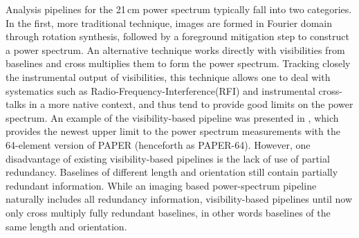 \documentclass[twocolumn,apj,numberedappendix]{emulateapj}
\renewcommand\[{\begin{equation}}
\renewcommand\]{\end{equation}}
\begin{document}
Analysis pipelines for the 21\,cm power spectrum typically fall into two categories. In the first, more traditional technique, images are formed in Fourier domain through rotation synthesis, followed by a foreground mitigation step to construct a power spectrum. An alternative technique works directly with visibilities from baselines and cross multiplies them to form the power spectrum. Tracking closely the instrumental output of visibilities, this technique allows one to deal with systematics such as Radio-Frequency-Interference(RFI) and instrumental cross-talks in a more native context, and thus tend to provide good limits on the power spectrum. An example of the visibility-based pipeline was presented in \cite{Ali2015}, which provides the newest upper limit to the power spectrum
measurements with the 64-element version of PAPER (henceforth as PAPER-64). However, one disadvantage of existing visibility-based pipelines is the lack of use of partial redundancy. Baselines of different length and orientation still contain partially redundant information. While an imaging based power-spectrum pipeline naturally includes all redundancy information, visibility-based pipelines until now only cross multiply fully redundant baselines, in other words baselines of the same length and orientation.
\end{document}
